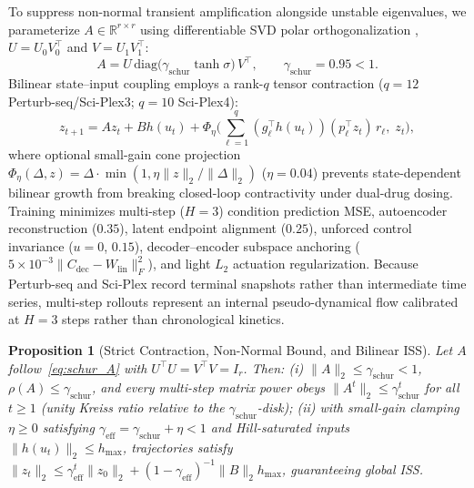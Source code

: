 \documentclass[journal]{IEEEtran}
\newtheorem{proposition}{Proposition}
\begin{document}
To suppress non-normal transient amplification alongside unstable eigenvalues, we parameterize $A \in \mathbb{R}^{r \times r}$ using differentiable SVD polar orthogonalization \cite{edelman1998geometry}, $U = U_0 V_0^\top$ and $V = U_1 V_1^\top$:
\begin{equation}
  A = U\,\mathrm{diag}\!\big(\gamma_{\mathrm{schur}} \tanh\sigma\big)\,V^\top, \qquad \gamma_{\mathrm{schur}} = 0.95 < 1.
  \label{eq:schur_A}
\end{equation}
Bilinear state--input coupling employs a rank-$q$ tensor contraction ($q=12$ Perturb-seq/Sci-Plex3; $q=10$ Sci-Plex4):
\begin{equation}
  z_{t+1} = A z_t + B h(u_t) + \Phi_{\eta}\!\Big(\sum_{\ell=1}^{q}(g_\ell^\top h(u_t))(p_\ell^\top z_t)\, r_\ell,\; z_t\Big),
  \label{eq:bilin_step}
\end{equation}
where optional small-gain cone projection $\Phi_\eta(\Delta, z) = \Delta \cdot \min(1, \eta \|z\|_2 / \|\Delta\|_2)$ ($\eta = 0.04$) prevents state-dependent bilinear growth from breaking closed-loop contractivity under dual-drug dosing. Training minimizes multi-step ($H=3$) condition prediction MSE, autoencoder reconstruction ($0.35$), latent endpoint alignment ($0.25$), unforced control invariance ($u=0$, $0.15$), decoder--encoder subspace anchoring ($5\times 10^{-3}\|C_{\mathrm{dec}} - W_{\mathrm{lin}}\|_F^2$), and light $L_2$ actuation regularization. Because Perturb-seq and Sci-Plex record terminal snapshots rather than intermediate time series, multi-step rollouts represent an internal pseudo-dynamical flow calibrated at $H=3$ steps rather than chronological kinetics.

\begin{proposition}[Strict Contraction, Non-Normal Bound, and Bilinear ISS]
\label{prop:schur_iss}
Let $A$ follow~\eqref{eq:schur_A} with $U^\top U = V^\top V = I_r$. Then: (i) $\|A\|_2 \le \gamma_{\mathrm{schur}} < 1$, $\rho(A) \le \gamma_{\mathrm{schur}}$, and every multi-step matrix power obeys $\|A^t\|_2 \le \gamma_{\mathrm{schur}}^t$ for all $t \ge 1$ (unity Kreiss ratio relative to the $\gamma_{\mathrm{schur}}$-disk); (ii) with small-gain clamping $\eta \ge 0$ satisfying $\gamma_{\mathrm{eff}} = \gamma_{\mathrm{schur}} + \eta < 1$ and Hill-saturated inputs $\|h(u_t)\|_2 \le h_{\max}$, trajectories satisfy $\|z_t\|_2 \le \gamma_{\mathrm{eff}}^t \|z_0\|_2 + (1-\gamma_{\mathrm{eff}})^{-1}\|B\|_2 h_{\max}$, guaranteeing global ISS.
\end{proposition}
\end{document}
